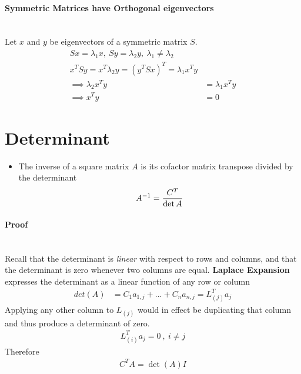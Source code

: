 \documentclass{article}
\newcommand{\myparagraph}[1]{\paragraph{#1}\mbox{}\\}
\begin{document}
\myparagraph{Symmetric Matrices have Orthogonal eigenvectors}{
  \newline
  Let $x$ and $y$ be eigenvectors of a symmetric matrix $S$.
  \begin{align*}
    Sx=\lambda_1x,~Sy=\lambda_2y,~\lambda_1\neq\lambda_2\\
    x^TSy=x^T\lambda_2y=(y^TSx)^T=\lambda_1x^Ty\\
    \implies \lambda_2x^Ty &=\lambda_1x^Ty\\
    \implies x^Ty &=0
  \end{align*}
}

\section{Determinant}
\begin{itemize}
  \item The inverse of a square matrix $A$ is its cofactor matrix transpose
  divided by the determinant
  \begin{align}
    A^{-1}={C^T\over \det{A}}
  \end{align}
\end{itemize}
\myparagraph{Proof}{
  \newline
  Recall that the determinant is \textit{linear} with respect to rows and columns,
  and that the determinant is zero whenever two columns are equal.\newline
  \textbf{Laplace Expansion} expresses the determinant as a linear function of
  any row or column
  \begin{align}
    det(A)&=C_1a_{1,j}+...+C_na_{n,j}=L_{(j)}^Ta_j
  \end{align}
  Applying any other column to $L_(j)$ would in effect be duplicating that column
  and thus produce a determinant of zero.
  \begin{align}
    L^T_{(i)}a_j=0~,~i\neq j
  \end{align}
  Therefore
  \begin{align}
    C^TA=\det(A)I
  \end{align}
}
\end{document}
